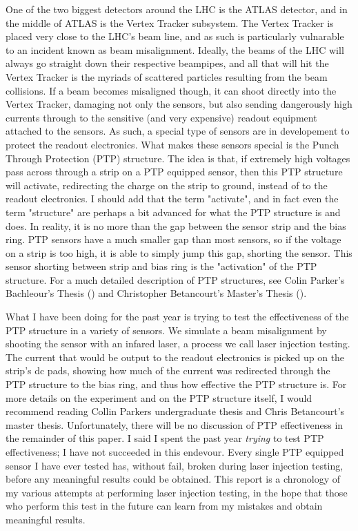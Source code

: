 \documentclass{report}
\begin{document}
        One of the two biggest detectors around the LHC is the ATLAS detector, and in the middle of ATLAS is the Vertex Tracker subsystem. The Vertex Tracker is placed very close to the LHC's beam line, and as such is particularly vulnarable to an incident known as beam misalignment. Ideally, the beams of the LHC will always go straight down their respective beampipes, and all that will hit the Vertex Tracker is the myriads of scattered particles resulting from the beam collisions. If a beam becomes misaligned though, it can shoot directly into the Vertex Tracker, damaging not only the sensors, but also sending dangerously high currents through to the sensitive (and very expensive) readout equipment attached to the sensors. As such, a special type of sensors are in developement to protect the readout electronics. What makes these sensors special is the Punch Through Protection (PTP) structure. The idea is that, if extremely high voltages pass across through a strip on a PTP equipped sensor, then this PTP structure will activate, redirecting the charge on the strip to ground, instead of to the readout electronics. I should add that the term "activate", and in fact even the term "structure" are perhaps a bit advanced for what the PTP structure is and does. In reality, it is no more than the gap between the sensor strip and the bias ring. PTP sensors have a much smaller gap than most sensors, so if the voltage on a strip is too high, it is able to simply jump this gap, shorting the sensor. This sensor shorting between strip and bias ring is the "activation" of the PTP structure. For a much detailed description of PTP structures, see Colin Parker's Bachleour's Thesis (\cite{parker_thesis}) and Christopher Betancourt's Master's Thesis (\cite{betancourt_thesis}).

        What I have been doing for the past year is trying to test the effectiveness of the PTP structure in a variety of sensors. We simulate a beam misalignment by shooting the sensor with an infared laser, a process we call laser injection testing. The current that would be output to the readout electronics is picked up on the strip's dc pads, showing how much of the current was redirected through the PTP structure to the bias ring, and thus how effective the PTP structure is. For more details on the experiment and on the PTP structure itself, I would recommend reading Collin Parkers undergraduate thesis and Chris Betancourt's master thesis. Unfortunately, there will be no discussion of PTP effectiveness in the remainder of this paper. I said I spent the past year \textit{trying} to test PTP effectiveness; I have not succeeded in this endevour. Every single PTP equipped sensor I have ever tested has, without fail, broken during laser injection testing, before any meaningful results could be obtained. This report is a chronology of my various attempts at performing laser injection testing, in the hope that those who perform this test in the future can learn from my mistakes and obtain meaningful results. 
\end{document}
